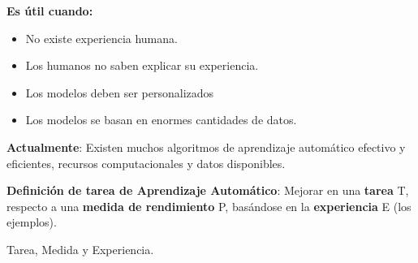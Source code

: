 \documentclass[12pt, twoside, openright]{report} %
\begin{document}
\pagebreak

\textbf{Es útil cuando:}

\begin{itemize}
\item
  No existe experiencia humana.
\item
  Los humanos no saben explicar su experiencia.
\item
  Los modelos deben ser personalizados
\item
  Los modelos se basan en enormes cantidades de datos.
\end{itemize}

\textbf{Actualmente}: Existen muchos algoritmos de aprendizaje
automático efectivo y eficientes, recursos computacionales y datos
disponibles.

\textbf{Definición de tarea de Aprendizaje Automático}: Mejorar en una
\textbf{tarea} T, respecto a una \textbf{medida de rendimiento} P,
basándose en la \textbf{experiencia} E (los ejemplos).

Tarea, Medida y Experiencia.
\end{document}
